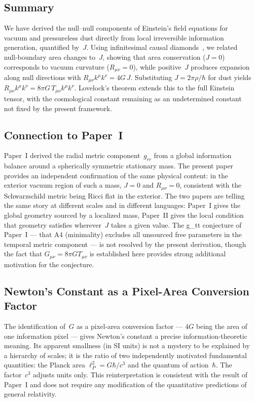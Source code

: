 \documentclass[12pt]{article}
\begin{document}
\subsection{Summary}

We have derived the null--null components of Einstein's field
equations for vacuum and pressureless dust directly from local
irreversible information generation, quantified by~$J$.
Using infinitesimal causal diamonds~\cite{Jacobson1995,Wald1984},
we related null-boundary area changes to~$J$, showing that
area conservation ($J=0$) corresponds to vacuum curvature
($R_{\mu\nu}=0$), while positive~$J$ produces expansion along
null directions with $R_{\mu\nu}k^\mu k^\nu = 4G\,J$.
Substituting $J=2\pi\rho/\hbar$ for dust yields
$R_{\mu\nu}k^\mu k^\nu = 8\pi G\,T_{\mu\nu}k^\mu k^\nu$.
Lovelock's theorem \cite{Lovelock1971} extends this to the
full Einstein tensor, with the cosmological constant remaining
as an undetermined constant not fixed by the present framework.

\subsection{Connection to Paper~I}

Paper~I derived the radial metric component~$g_{rr}$ from
a global information balance around a spherically symmetric
stationary mass.
The present paper provides an independent confirmation of
the same physical content: in the exterior vacuum region of
such a mass, $J=0$ and $R_{\mu\nu}=0$, consistent with the
Schwarzschild metric being Ricci flat in the exterior.
The two papers are telling the same story at different scales
and in different languages: Paper~I gives the global geometry
sourced by a localized mass, Paper~II gives the local condition
that geometry satisfies wherever~$J$ takes a given value.
The g_tt conjecture of Paper~I --- that A4 (minimality)
excludes all unsourced free parameters in the temporal metric
component --- is not resolved by the present derivation, though
the fact that $G_{\mu\nu}=8\pi G T_{\mu\nu}$ is established here
provides strong additional motivation for the conjecture.

\subsection{Newton's Constant as a Pixel-Area Conversion Factor}

The identification of~$G$ as a pixel-area conversion factor ---
$4G$ being the area of one information pixel --- gives Newton's
constant a precise information-theoretic meaning.
Its apparent smallness (in SI units) is not a mystery to be
explained by a hierarchy of scales; it is the ratio of two
independently motivated fundamental quantities: the Planck
area $\ell_P^2 = G\hbar/c^3$ and the quantum of action~$\hbar$.
The factor~$c^3$ adjusts units only.
This reinterpretation is consistent with the result of Paper~I
and does not require any modification of the quantitative
predictions of general relativity.
\end{document}
